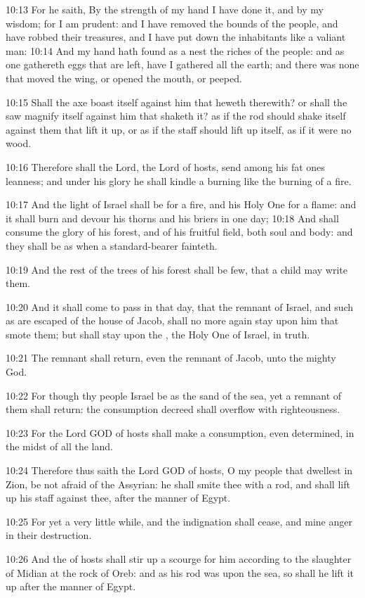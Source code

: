 10:13 For he saith, By the strength of my hand I have done it, and by my wisdom; for I am prudent: and I have removed the bounds of the people, and have robbed their treasures, and I have put down the inhabitants like a valiant man: 10:14 And my hand hath found as a nest the riches of the people: and as one gathereth eggs that are left, have I gathered all the earth; and there was none that moved the wing, or opened the mouth, or peeped.

10:15 Shall the axe boast itself against him that heweth therewith? or shall the saw magnify itself against him that shaketh it? as if the rod should shake itself against them that lift it up, or as if the staff should lift up itself, as if it were no wood.

10:16 Therefore shall the Lord, the Lord of hosts, send among his fat ones leanness; and under his glory he shall kindle a burning like the burning of a fire.

10:17 And the light of Israel shall be for a fire, and his Holy One for a flame: and it shall burn and devour his thorns and his briers in one day; 10:18 And shall consume the glory of his forest, and of his fruitful field, both soul and body: and they shall be as when a standard-bearer fainteth.

10:19 And the rest of the trees of his forest shall be few, that a child may write them.

10:20 And it shall come to pass in that day, that the remnant of Israel, and such as are escaped of the house of Jacob, shall no more again stay upon him that smote them; but shall stay upon the \LORD, the Holy One of Israel, in truth.

10:21 The remnant shall return, even the remnant of Jacob, unto the mighty God.

10:22 For though thy people Israel be as the sand of the sea, yet a remnant of them shall return: the consumption decreed shall overflow with righteousness.

10:23 For the Lord GOD of hosts shall make a consumption, even determined, in the midst of all the land.

10:24 Therefore thus saith the Lord GOD of hosts, O my people that dwellest in Zion, be not afraid of the Assyrian: he shall smite thee with a rod, and shall lift up his staff against thee, after the manner of Egypt.

10:25 For yet a very little while, and the indignation shall cease, and mine anger in their destruction.

10:26 And the \LORD of hosts shall stir up a scourge for him according to the slaughter of Midian at the rock of Oreb: and as his rod was upon the sea, so shall he lift it up after the manner of Egypt.

